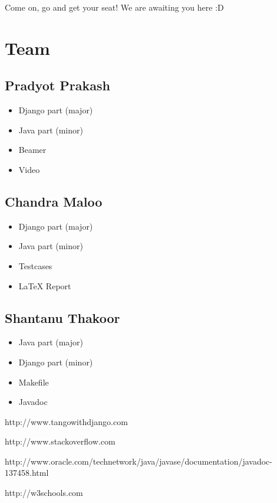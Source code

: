 \documentclass[]{report}
\begin{document}
Come on, go and get your seat! We are awaiting you here :D


\chapter{Team}
\section{Pradyot Prakash}
\begin{itemize}
\item Django part (major)
\item Java part (minor)
\item Beamer
\item Video
\end{itemize}
\section{Chandra Maloo}
\begin{itemize}
\item Django part (major)
\item Java part (minor)
\item Testcases
\item LaTeX Report
\end{itemize}
\section{Shantanu Thakoor}
\begin{itemize}
\item Java part (major)
\item Django part (minor)
\item Makefile
\item Javadoc
\end{itemize}

\begin{thebibliography}{9}
\item http://www.tangowithdjango.com
\item http://www.stackoverflow.com
\item http://www.oracle.com/technetwork/java/javase/documentation/javadoc-137458.html
\item http://w3schools.com
\end{thebibliography}
\end{document}
